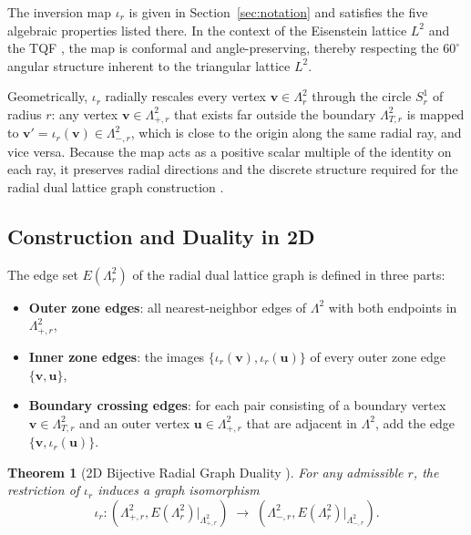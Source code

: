 \documentclass{article}
\newtheorem{theorem}{Theorem}
\begin{document}
The inversion map $\iota_r$ is given in Section~\ref{sec:notation} and satisfies the five algebraic properties listed there. In the context of the Eisenstein lattice $L^2$ and the TQF \cite{Schmidt2025,SchmidtTriQuarterGeneral}, the map is conformal and angle-preserving, thereby respecting the $60^\circ$ angular structure inherent to the triangular lattice $L^2$.

Geometrically, $\iota_r$ radially rescales every vertex $\mathbf{v} \in \Lambda_{r}^2$ through the circle $S_r^1$ of radius $r$: any vertex $\mathbf{v} \in \Lambda_{+,r}^2$ that exists far outside the boundary $\Lambda_{T,r}^2$ is mapped to $\mathbf{v}' = \iota_r(\mathbf{v}) \in \Lambda_{-,r}^2$, which is close to the origin along the same radial ray, and vice versa. Because the map acts as a positive scalar multiple of the identity on each ray, it preserves radial directions and the discrete structure required for the radial dual lattice graph construction \cite{Schmidt2025}.

\subsection{Construction and Duality in 2D}
\label{subsec:2d-graph-construction-duality}
The edge set $E(\Lambda_r^2)$ of the radial dual lattice graph is defined in three parts:
\begin{itemize}
  \item \textbf{Outer zone edges}: all nearest-neighbor edges of $\Lambda^2$ with both endpoints in $\Lambda_{+,r}^2$,
  \item \textbf{Inner zone edges}: the images $\{\iota_r(\mathbf{v}), \iota_r(\mathbf{u})\}$ of every outer zone edge $\{\mathbf{v}, \mathbf{u}\}$,
  \item \textbf{Boundary crossing edges}: for each pair consisting of a boundary vertex $\mathbf{v} \in \Lambda_{T,r}^2$ and an outer vertex $\mathbf{u} \in \Lambda_{+,r}^2$ that are adjacent in $\Lambda^2$, add the edge $\{\mathbf{v}, \iota_r(\mathbf{u})\}$.
\end{itemize}

\begin{theorem}[2D Bijective Radial Graph Duality \cite{Schmidt2025}]
\label{thm:2d-duality}
For any admissible $r$, the restriction of $\iota_r$ induces a graph isomorphism
\[
\iota_r \colon (\Lambda_{+,r}^2, E(\Lambda_r^2)|_{\Lambda_{+,r}^2}) \;\to\; (\Lambda_{-,r}^2, E(\Lambda_r^2)|_{\Lambda_{-,r}^2}).
\]
\end{theorem}
\end{document}
